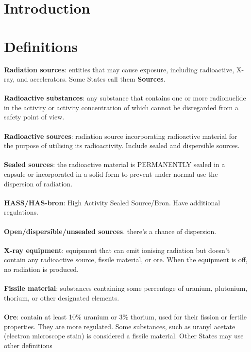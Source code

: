 \section{Introduction}
\section{Definitions}
\textbf{Radiation sources}: entities that may cause exposure, including radioactive, X-ray, and accelerators. Some States call them \textbf{Sources}.\\\\
\textbf{Radioactive substances}: any substance that contains one or more radionuclide in the activity or activity concentration of which cannot be disregarded from a safety point of view.\\\\
\textbf{Radioactive sources}: radiation source incorporating radioactive material for the purpose of utilising its radioactivity. Include sealed and dispersible sources.\\\\
\textbf{Sealed sources}: the radioactive material is PERMANENTLY sealed in a capsule or incorporated in a solid form to prevent under normal use the dispersion of radiation.\\\\
\textbf{HASS/HAS-bron}: High Activity Sealed Source/Bron. Have additional regulations. \\\\
\textbf{Open/dispersible/unsealed sources}. there's a chance of dispersion.\\\\
\textbf{X-ray equipment}: equipment that can emit ionising radiation but doesn't contain any radioactive source, fissile material, or ore. When the equipment is off, no radiation is produced.\\\\
\textbf{Fissile material}: substances containing some percentage of uranium, plutonium, thorium, or other designated elements.\\\\
\textbf{Ore}: contain at least 10\% uranium or 3\% thorium, used for their fission or fertile properties. They are more regulated. Some substances, such as uranyl acetate (electron microscope stain) is considered a fissile material. Other States may use other definitions
